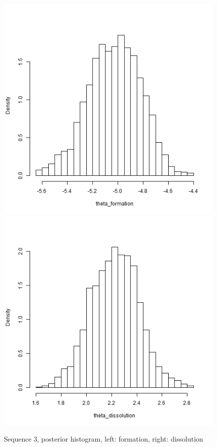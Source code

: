 \documentclass[a4paper, 11pt]{report}
\theoremstyle{definition}
\begin{document}
\begin{figure}[h]
    \begin{center}
        \includegraphics[scale=0.395]{pictures/net3seq_chain1_BSTERGM_formation_histogram.png}
        \includegraphics[scale=0.395]{pictures/net3seq_chain1_BSTERGM_dissolution_histogram.png}
    \caption{Sequence 3, posterior histogram, left: formation, right: dissolution}
    \end{center}
\end{figure}
\clearpage
\end{document}
